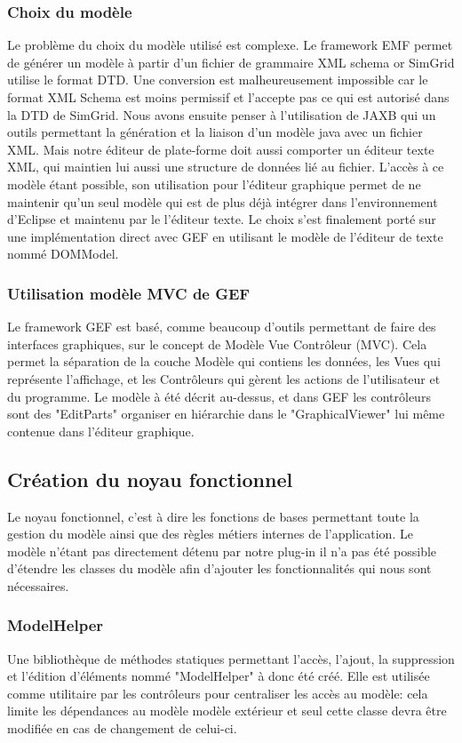 \documentclass{article}
\begin{document}
    \subsubsection{Choix du modèle}
    Le problème du choix du modèle utilisé est complexe. Le framework EMF permet de générer un modèle à partir d'un fichier de grammaire XML schema or SimGrid utilise le format DTD. Une conversion est malheureusement impossible car le format XML Schema est moins permissif et l'accepte pas ce qui est autorisé dans la DTD de SimGrid.
    Nous avons ensuite penser à l'utilisation de JAXB qui un outils permettant la génération et la liaison d'un modèle java avec un fichier XML. Mais notre éditeur de plate-forme doit aussi comporter un éditeur texte XML, qui maintien lui aussi une structure de données lié au fichier. L'accès à ce modèle étant possible, son utilisation pour l'éditeur graphique permet de ne maintenir qu'un seul modèle qui est de plus déjà intégrer dans l'environnement d'Eclipse et maintenu par le l'éditeur texte.
    Le choix s'est finalement porté sur une implémentation direct avec GEF en utilisant le modèle de l'éditeur de texte nommé DOMModel.
    \subsubsection{Utilisation modèle MVC de GEF}
    Le framework GEF est basé, comme beaucoup d'outils permettant de faire des interfaces graphiques, sur le concept de Modèle Vue Contrôleur (MVC). Cela permet la séparation de la couche Modèle qui contiens les données, les Vues qui représente l'affichage, et les Contrôleurs qui gèrent les actions de l'utilisateur et du programme. Le modèle à été décrit au-dessus, et dans GEF les contrôleurs sont des "EditParts" organiser en hiérarchie dans le "GraphicalViewer" lui même contenue dans l'éditeur graphique.
    \subsection{Création du noyau fonctionnel}
    	Le noyau fonctionnel, c'est à dire les fonctions de bases permettant toute la gestion du modèle ainsi que des règles métiers internes de l'application. Le modèle n'étant pas directement détenu par notre plug-in il n'a pas été possible d'étendre les classes du modèle afin d'ajouter les fonctionnalités qui nous sont nécessaires.
        \subsubsection{ModelHelper}
        Une bibliothèque de méthodes statiques permettant l'accès, l'ajout, la suppression et l'édition d'éléments nommé "ModelHelper" à donc été créé. Elle est utilisée comme utilitaire par les contrôleurs pour centraliser les accès au modèle: cela limite les dépendances au modèle modèle extérieur et seul cette classe devra être modifiée en cas de changement de celui-ci.
\end{document}
